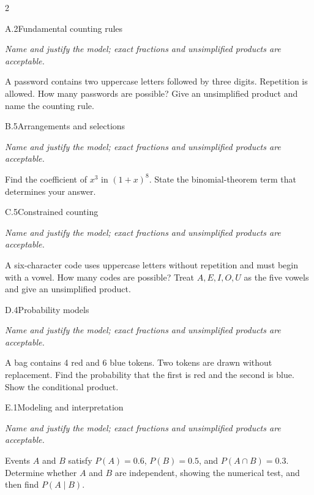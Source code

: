 \documentclass[9pt]{extarticle}
\begin{document}
\begin{multicols}{2}
\begin{CoreProblem}{A.2}{Fundamental counting rules}
{\scriptsize\textit{Name and justify the model; exact fractions and unsimplified products are acceptable.}\par}
A password contains two uppercase letters followed by three digits.
    Repetition is allowed. How many passwords are possible? Give an unsimplified
    product and name the counting rule.
\end{CoreProblem}
\begin{CoreProblem}{B.5}{Arrangements and selections}
{\scriptsize\textit{Name and justify the model; exact fractions and unsimplified products are acceptable.}\par}
Find the coefficient of $x^3$ in $(1+x)^8$. State the binomial-theorem
    term that determines your answer.
\end{CoreProblem}
\begin{CoreProblem}{C.5}{Constrained counting}
{\scriptsize\textit{Name and justify the model; exact fractions and unsimplified products are acceptable.}\par}
A six-character code uses uppercase letters without repetition and
    must begin with a vowel. How many codes are possible? Treat
    $A,E,I,O,U$ as the five vowels and give an unsimplified product.
\end{CoreProblem}
\columnbreak
\begin{CoreProblem}{D.4}{Probability models}
{\scriptsize\textit{Name and justify the model; exact fractions and unsimplified products are acceptable.}\par}
A bag contains 4 red and 6 blue tokens. Two tokens are drawn without
    replacement. Find the probability that the first is red and the second is
    blue. Show the conditional product.
\end{CoreProblem}
\begin{CoreProblem}{E.1}{Modeling and interpretation}
{\scriptsize\textit{Name and justify the model; exact fractions and unsimplified products are acceptable.}\par}
Events $A$ and $B$ satisfy $P(A)=0.6$, $P(B)=0.5$, and
    $P(A\cap B)=0.3$. Determine whether $A$ and $B$ are independent, showing
    the numerical test, and then find $P(A\mid B)$.
\end{CoreProblem}
\end{multicols}
\CoreWorkArea
\FormBreak
{}
\end{document}
